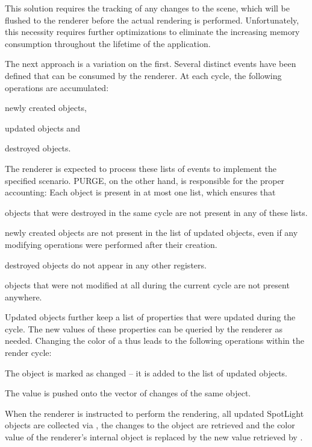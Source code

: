 	This solution requires the tracking of any changes to the scene, which will be flushed to the renderer before the actual rendering is performed. Unfortunately, this necessity requires further optimizations to eliminate the increasing memory consumption throughout the lifetime of the application.

	The next approach is a variation on the first. Several distinct events have been defined that can be consumed by the renderer. At each cycle, the following operations are accumulated:

	\begin{smalllist}
		\item newly created objects,
		\item updated objects and
		\item destroyed objects.
	\end{smalllist}
	
	The renderer is expected to process these lists of events to implement the specified scenario. PURGE, on the other hand, is responsible for the proper accounting: Each object is present in at most one list, which ensures that

	\begin{smalllist}
		\item objects that were destroyed in the same cycle are not present in any of these lists.
		\item newly created objects are not present in the list of updated objects, even if any modifying operations were performed after their creation.
		\item destroyed objects do not appear in any other registers.
		\item objects that were not modified at all during the current cycle are not present anywhere.
	\end{smalllist}

	Updated objects further keep a list of properties that were updated during the cycle. The new values of these properties can be queried by the renderer as needed. Changing the color of a  thus leads to the following operations within the render cycle:

	\begin{numlist}
		\item The object is marked as changed -- it is added to the list of updated  objects.
		\item The value  is pushed onto the vector of changes of the same object.
		\item When the renderer is instructed to perform the rendering, all updated SpotLight objects are collected via , the changes to the object are retrieved and the color value of the renderer's internal  object is replaced by the new value retrieved by .
	\end{numlist}

